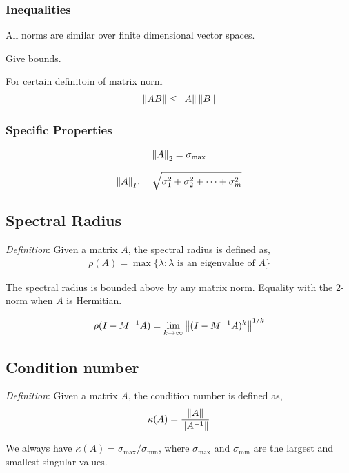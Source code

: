 \documentclass[12pt]{article}
\begin{document}
\subsubsection{Inequalities}

All norms are similar over finite dimensional vector spaces.

Give bounds.

For certain definitoin of matrix norm
\begin{align*}
    \left\lVert A B\right\rVert \leq \left\lVert A\right\rVert\left\lVert B\right\rVert
\end{align*}


\subsubsection{Specific Properties}
\begin{align*}
    \left\lVert A\right\rVert_2 = \sigma_{\text{max}}
\end{align*}

\begin{align*}
    \left\lVert A\right\rVert_F = \sqrt{\sigma_1^2 + \sigma_2^2 + \cdots + \sigma_m^2}
\end{align*}


\subsection{Spectral Radius}
\textit{Definition}: Given a matrix \( A \), the spectral radius is defined as,
\begin{align*}
    \rho(A) = \max \{ \lambda : \lambda \text{ is an eigenvalue of } A \}
\end{align*}

The spectral radius is bounded above by any matrix norm. Equality with the 2-norm when \( A \) is Hermitian.

\begin{align*}
    \rho(I-M^{-1}A) = \lim_{k\to\infty} \left\lVert(I-M^{-1}A)^k\right\rVert^{1/k}
\end{align*}


\subsection{Condition number}
\textit{Definition}: Given a matrix \( A \), the condition number is defined as,
\begin{align*}
    \kappa(A) = \frac{\left\lVert A\right\rVert}{\left\lVert A^{-1}\right\rVert}
\end{align*}

We always have \( \kappa(A) = \sigma_{\text{max}}/\sigma_{\text{min}} \), where \( \sigma_\text{max} \) and \( \sigma_\text{min} \) are the largest and smallest singular values.
\end{document}
